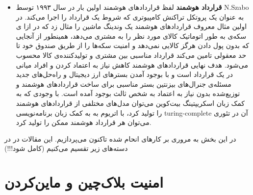 \begin{itemize}
	\item
	\textbf{قرارداد هوشمند}
	لفظ قرارداد‌های هوشمند اولین بار در سال ۱۹۹۳ توسط N.Szabo به عنوان یک پروتکل تراکنش کامپیوتری که شروط یک قرارداد را اجرا می‌کند. در اولین مثال معروف قرارداد‌های هوشمند یک وندینگ‌ ماشین را مثال زد که در ازا ی سکه‌ی به طور اتوماتیک کالای مورد نظر را به مشتری می‌دهد، همینطور از آنجایی که بدون پول دادن هرگز کالایی نمی‌دهد و امنیت سکه‌ها را از طریق صندوق خود تا حد معقولی تامین می‌کند قرارداد مناسبی بین مشتری و تولیدکننده‌ی کالا محسوب می‌شود.
	هدف نهایی قراردادهای هوشمند کاهش نیاز به اعتماد کردن و افراد میانی در یک قرارداد است و با بوجود آمدن بسترهای ارز دیجیتال و راه‌حل‌های جدید مسئله‌ی جنرال‌های بیزنتین بستر مناسبی برای ساخت قراردادهای هوشمند و توزیع‌شده بدون نیاز به اعتماد به شخص ثالث بوجود آمده است. 
	با وجودی که به کمک زبان اسکریپتینگ بیت‌کوین می‌توان مدل‌های مختلفی از قرارداد‌های هوشمند را تولید کرد، با اتریوم به به کمک زبان برنامه‌نویسی turing-complete آن در تئوری می‌توان هر قرارداد هوشمند ممکن را تولید کرد. 
	
	
\end{itemize}

در این بخش به مروری بر کارهای انحام شده تاکنون می‌پردازیم. این مقالات در در دسته‌های زیر تقسیم می‌کنیم (کامل شود!!!)

\section{امنیت بلاک‌چین و ماین‌کردن}

